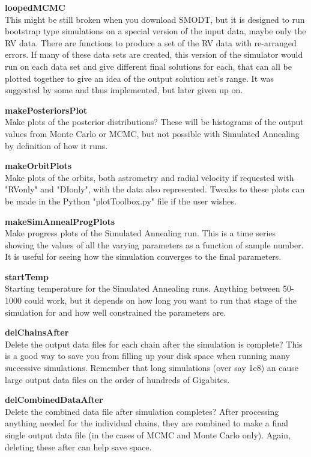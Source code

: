\documentclass[12pt,preprint]{aastex}
\begin{document}
{\bf loopedMCMC}\\
This might be still broken when you download SMODT, but it is designed to run bootstrap type simulations on a special version of the input data, maybe only the RV data.  There are functions to produce a set of the RV data with re-arranged errors.  If many of these data sets are created, this version of the simulator would run on each data set and give different final solutions for each, that can all be plotted together to give an idea of the output solution set's range.  It was suggested by some and thus implemented, but later given up on.

{\bf makePosteriorsPlot}\\
Make plots of the posterior distributions?  These will be histograms of the output values from Monte Carlo or MCMC, but not possible with Simulated Annealing by definition of how it runs.

{\bf makeOrbitPlots}\\
Make plots of the orbits, both astrometry and radial velocity if requested with "RVonly" and "DIonly", with the data also represented.  Tweaks to these plots can be made in the Python "plotToolbox.py" file if the user wishes.

{\bf makeSimAnnealProgPlots}\\
Make progress plots of the Simulated Annealing run.  This is a time series showing the values of all the varying parameters as a function of sample number.  It is useful for seeing how the simulation converges to the final parameters.

{\bf startTemp}\\
Starting temperature for the Simulated Annealing runs.  Anything between 50-1000 could work, but it depends on how long you want to run that stage of the simulation for and how well constrained the parameters are.

{\bf delChainsAfter}\\
Delete the output data files for each chain after the simulation is complete?  This is a good way to save you from filling up your disk space when running many successive simulations.  Remember that long simulations (over say 1e8) an cause large output data files on the order of hundreds of Gigabites.

{\bf delCombinedDataAfter}\\
Delete the combined data file after simulation completes?  After processing anything needed for the individual chains, they are combined to make a final single output data file (in the cases of MCMC and Monte Carlo only).  Again, deleting these after can help save space.
\end{document}
